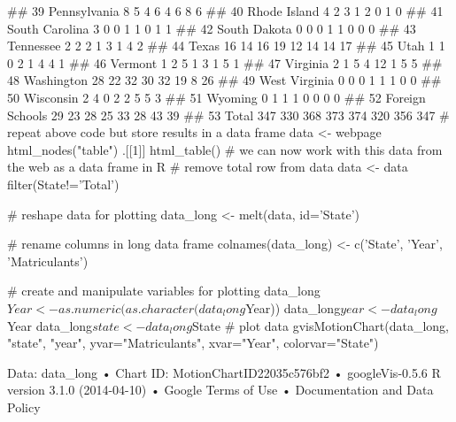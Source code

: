 ## 39    Pennsylvania    8    5    4    6    4    6    8    6
## 40    Rhode Island    4    2    3    1    2    0    1    0
## 41  South Carolina    3    0    0    1    1    0    1    1
## 42    South Dakota    0    0    0    1    1    0    0    0
## 43       Tennessee    2    2    2    1    3    1    4    2
## 44           Texas   16   14   16   19   12   14   14   17
## 45            Utah    1    1    0    2    1    4    4    1
## 46         Vermont    1    2    5    1    3    1    5    1
## 47        Virginia    2    1    5    4   12    1    5    5
## 48      Washington   28   22   32   30   32   19    8   26
## 49   West Virginia    0    0    0    1    1    1    0    0
## 50       Wisconsin    2    4    0    2    2    5    5    3
## 51         Wyoming    0    1    1    1    0    0    0    0
## 52 Foreign Schools   29   23   28   25   33   28   43   39
## 53           Total  347  330  368  373  374  320  356  347
# repeat above code but store results in a data frame
data <- 
webpage %
  html_nodes("table") %
  .[[1]] %
  html_table()
# we can now work with this data from the web as a data frame in R
# remove total row from data 
data <- 
  data %
  filter(State!='Total')

# reshape data for plotting 
data_long <- melt(data, id='State')

# rename columns in long data frame 
colnames(data_long) <- c('State', 'Year', 'Matriculants')

# create and manipulate variables for plotting
data_long$Year <- as.numeric(as.character(data_long$Year))
data_long$year <- data_long$Year
data_long$state <- data_long$State
# plot data 
gvisMotionChart(data_long, "state", "year",
                yvar="Matriculants", xvar="Year",
                colorvar="State")

Data: data_long • Chart ID: MotionChartID22035c576bf2 • googleVis-0.5.6
R version 3.1.0 (2014-04-10) • Google Terms of Use • Documentation and Data Policy
